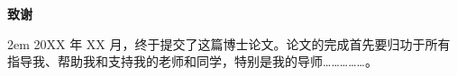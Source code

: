 \clearpage
{}
{}
\begingroup
    \centering
    \heiti\bfseries 致\quad 谢
    \par
    \vspace{\baselineskip}
\endgroup

\begingroup
    \songti
    \setlength{\baselineskip}{\bodylineskip}
    \parindent 2em
    20XX 年 XX 月，终于提交了这篇博士论文。论文的完成首先要归功于所有指导我、帮助我和支持我的老师和同学，特别是我的导师\dots\dots\dots\dots\dots。
\endgroup

\clearpage
\mbox{}\clearpage 
